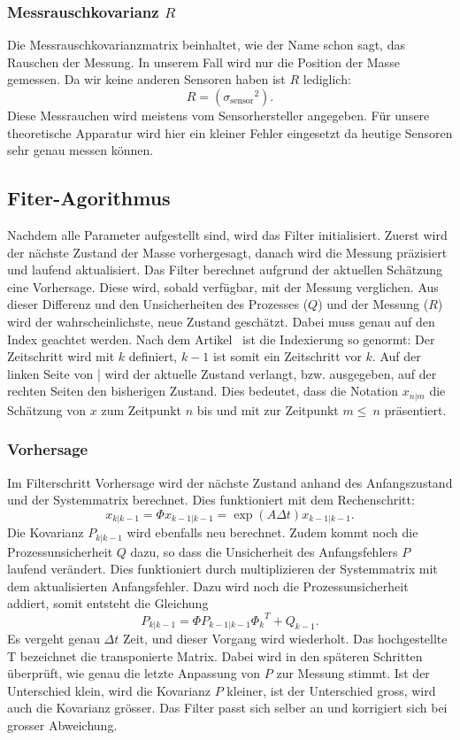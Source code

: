 \subsubsection*{Messrauschkovarianz $R$}
Die Messrauschkovarianzmatrix beinhaltet, wie der Name schon sagt, das Rauschen der Messung. 
In unserem Fall wird nur die Position der Masse gemessen. Da wir keine anderen Sensoren haben ist $R$ lediglich:
\[ 
R= ({\sigma_\mathrm{sensor}}^2).
 \] 
Diese Messrauchen wird meistens vom Sensorhersteller angegeben. 
Für unsere theoretische Apparatur wird hier ein kleiner Fehler eingesetzt da heutige Sensoren sehr genau messen können. 

\subsection{Fiter-Agorithmus}
Nachdem alle Parameter aufgestellt sind, wird das Filter initialisiert.
Zuerst wird der nächste Zustand der Masse vorhergesagt, danach wird die Messung präzisiert und laufend aktualisiert. 
Das Filter berechnet aufgrund der aktuellen Schätzung eine Vorhersage. 
Diese wird, sobald verfügbar, mit der Messung verglichen. 
Aus dieser Differenz und den Unsicherheiten des Prozesses ($Q$) und der Messung ($R$) wird der wahrscheinlichste, neue Zustand geschätzt.
Dabei muss genau auf den Index geachtet werden. Nach dem Artikel~\cite{erdbeben:wikipedia} ist die Indexierung so genormt:
Der Zeitschritt wird mit $k$ definiert, $k-1$ ist somit ein Zeitschritt vor $k$.
Auf der linken Seite von | wird der aktuelle Zustand verlangt, bzw. ausgegeben, auf der rechten Seiten den bisherigen Zustand.
Dies bedeutet, dass die Notation $x_{n|m}$ die Schätzung von $x$ zum Zeitpunkt $n$ bis und mit zur Zeitpunkt $m \leq \ n$ präsentiert. 

\subsubsection*{Vorhersage}
Im Filterschritt Vorhersage wird der nächste Zustand anhand des Anfangszustand und der Systemmatrix berechnet. 
Dies funktioniert mit dem Rechenschritt:
\[
{x_{k|k-1}}=\Phi{x_{k-1|k-1}}= \exp(A\Delta t){x_{k-1|k-1}}.
\] 
Die Kovarianz $P_{k|k-1}$ wird ebenfalls neu berechnet. Zudem kommt noch die Prozessunsicherheit $Q$ dazu, so dass die Unsicherheit des Anfangsfehlers $P$ laufend verändert. 
Dies funktioniert durch multiplizieren der Systemmatrix mit dem aktualisierten Anfangsfehler. 
Dazu wird noch die Prozessunsicherheit addiert, somit entsteht die Gleichung
\[
{P_{k|k-1}}=\Phi {P_{k-1|k-1}} {\Phi _{k}}^T + {Q_{k-1}}.
\] 
Es vergeht genau $\Delta t$ Zeit, und dieser Vorgang wird wiederholt. 
Das hochgestellte T bezeichnet die transponierte Matrix.
Dabei wird in den späteren Schritten überprüft, wie genau die letzte Anpassung von $P$ zur Messung stimmt. 
Ist der Unterschied klein, wird die Kovarianz $P$ kleiner, ist der Unterschied gross, wird auch die Kovarianz grösser. 
Das Filter passt sich selber an und korrigiert sich bei grosser Abweichung.

